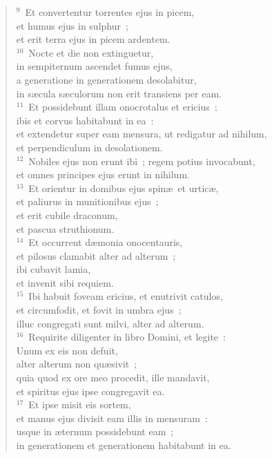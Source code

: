 \begin{flushleft}
\begin{verse}
${}^{9}$~Et convertentur torrentes ejus in picem,\\ et humus ejus in sulphur~;\\ et erit terra ejus in picem ardentem.\\
${}^{10}$~Nocte et die non extinguetur,\\ in sempiternum ascendet fumus ejus,\\ a generatione in generationem desolabitur,\\ in s\ae cula s\ae culorum non erit transiens per eam.\\
${}^{11}$~Et possidebunt illam onocrotalus et ericius~;\\ ibis et corvus habitabunt in ea~:\\ et extendetur super eam mensura, ut redigatur ad nihilum,\\ et perpendiculum in desolationem.\\
${}^{12}$~Nobiles ejus non erunt ibi~; regem potius invocabunt,\\ et omnes principes ejus erunt in nihilum.\\
${}^{13}$~Et orientur in domibus ejus spin\ae\ et urtic\ae ,\\ et paliurus in munitionibus ejus~;\\ et erit cubile draconum,\\ et pascua struthionum.\\
${}^{14}$~Et occurrent d\ae monia onocentauris,\\ et pilosus clamabit alter ad alterum~;\\ ibi cubavit lamia,\\ et invenit sibi requiem.\\
${}^{15}$~Ibi habuit foveam ericius, et enutrivit catulos,\\ et circumfodit, et fovit in umbra ejus~;\\ illuc congregati sunt milvi, alter ad alterum.\\
${}^{16}$~Requirite diligenter in libro Domini, et legite~:\\ Unum ex eis non defuit,\\ alter alterum non qu\ae sivit~;\\ quia quod ex ore meo procedit, ille mandavit,\\ et spiritus ejus ipse congregavit ea.\\
${}^{17}$~Et ipse misit eis sortem,\\ et manus ejus divisit eam illis in mensuram~:\\ usque in \ae ternum possidebunt eam~;\\ in generationem et generationem habitabunt in ea.\end{verse}\end{flushleft}


